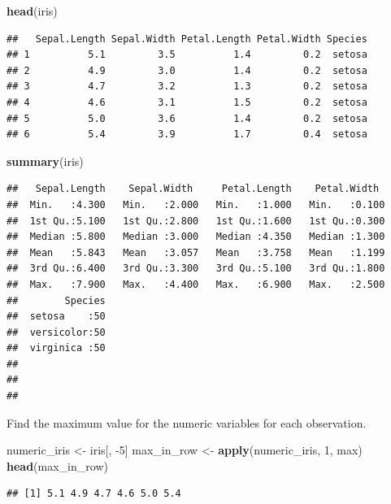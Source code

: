 \documentclass[
]{book}
\newenvironment{Shaded}{\begin{snugshade}}{\end{snugshade}}
\newcommand{\DecValTok}[1]{\textcolor[rgb]{0.00,0.00,0.81}{#1}}
\newcommand{\KeywordTok}[1]{\textcolor[rgb]{0.13,0.29,0.53}{\textbf{#1}}}
\newcommand{\NormalTok}[1]{#1}
\newcommand{\StringTok}[1]{\textcolor[rgb]{0.31,0.60,0.02}{#1}}
\begin{document}
\begin{Shaded}
\begin{Highlighting}[]
\KeywordTok{head}\NormalTok{(iris)}
\end{Highlighting}
\end{Shaded}

\begin{verbatim}
##   Sepal.Length Sepal.Width Petal.Length Petal.Width Species
## 1          5.1         3.5          1.4         0.2  setosa
## 2          4.9         3.0          1.4         0.2  setosa
## 3          4.7         3.2          1.3         0.2  setosa
## 4          4.6         3.1          1.5         0.2  setosa
## 5          5.0         3.6          1.4         0.2  setosa
## 6          5.4         3.9          1.7         0.4  setosa
\end{verbatim}

\begin{Shaded}
\begin{Highlighting}[]
\KeywordTok{summary}\NormalTok{(iris)}
\end{Highlighting}
\end{Shaded}

\begin{verbatim}
##   Sepal.Length    Sepal.Width     Petal.Length    Petal.Width   
##  Min.   :4.300   Min.   :2.000   Min.   :1.000   Min.   :0.100  
##  1st Qu.:5.100   1st Qu.:2.800   1st Qu.:1.600   1st Qu.:0.300  
##  Median :5.800   Median :3.000   Median :4.350   Median :1.300  
##  Mean   :5.843   Mean   :3.057   Mean   :3.758   Mean   :1.199  
##  3rd Qu.:6.400   3rd Qu.:3.300   3rd Qu.:5.100   3rd Qu.:1.800  
##  Max.   :7.900   Max.   :4.400   Max.   :6.900   Max.   :2.500  
##        Species  
##  setosa    :50  
##  versicolor:50  
##  virginica :50  
##                 
##                 
## 
\end{verbatim}

Find the maximum value for the numeric variables for each observation.

\begin{Shaded}
\begin{Highlighting}[]
\NormalTok{numeric_iris <-}\StringTok{ }\NormalTok{iris[,}
    \DecValTok{-5}\NormalTok{]}
\NormalTok{max_in_row <-}\StringTok{ }\KeywordTok{apply}\NormalTok{(numeric_iris,}
    \DecValTok{1}\NormalTok{, max)}
\KeywordTok{head}\NormalTok{(max_in_row)}
\end{Highlighting}
\end{Shaded}

\begin{verbatim}
## [1] 5.1 4.9 4.7 4.6 5.0 5.4
\end{verbatim}
\end{document}
